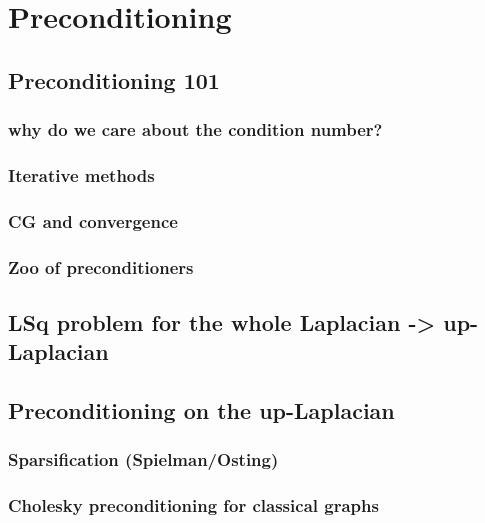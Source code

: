\chapter{ Preconditioning }


\section{Preconditioning 101}

\subsection{ why do we care about the condition number?}


\subsection{ Iterative methods }


\subsection{ CG and convergence  }


\subsection{ Zoo of preconditioners }




\section{ LSq problem for the whole Laplacian -> up-Laplacian }
      
\section{ Preconditioning on the up-Laplacian }
      
\subsection{ Sparsification (Spielman/Osting) }
      
\subsection{ Cholesky preconditioning for classical graphs  }


